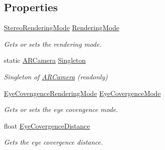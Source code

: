\subsection*{Properties}
\begin{DoxyCompactItemize}
\item 
\mbox{\hyperlink{class_ximmerse_1_1_slide_in_s_d_k_1_1_a_r_camera_af5ab911106768696ff764dd86e435d58}{Stereo\+Rendering\+Mode}} \mbox{\hyperlink{class_ximmerse_1_1_slide_in_s_d_k_1_1_a_r_camera_aafc2e51fcad4a3afd2d4be6a6beca488}{Rendering\+Mode}}
\begin{DoxyCompactList}\small\item\em Gets or sets the rendering mode. \end{DoxyCompactList}\item 
static \mbox{\hyperlink{class_ximmerse_1_1_slide_in_s_d_k_1_1_a_r_camera}{A\+R\+Camera}} \mbox{\hyperlink{class_ximmerse_1_1_slide_in_s_d_k_1_1_a_r_camera_aa35b0089674333aea7cabb9d9d8cb065}{Singleton}}
\begin{DoxyCompactList}\small\item\em Singleton of \mbox{\hyperlink{class_ximmerse_1_1_slide_in_s_d_k_1_1_a_r_camera}{A\+R\+Camera}} (readonly) \end{DoxyCompactList}\item 
\mbox{\hyperlink{class_ximmerse_1_1_slide_in_s_d_k_1_1_a_r_camera_a52b8f8314b24b886c20c6a8f4f7447bf}{Eye\+Covengence\+Rendering\+Mode}} \mbox{\hyperlink{class_ximmerse_1_1_slide_in_s_d_k_1_1_a_r_camera_aa8ea24d9b7f9f1edb8385e5be8b6706c}{Eye\+Covergence\+Mode}}
\begin{DoxyCompactList}\small\item\em Gets or sets the eye covengence mode. \end{DoxyCompactList}\item 
float \mbox{\hyperlink{class_ximmerse_1_1_slide_in_s_d_k_1_1_a_r_camera_acabcae53101b1000d42ca0598b392da9}{Eye\+Covergence\+Distance}}
\begin{DoxyCompactList}\small\item\em Gets the eye covergence distance. \end{DoxyCompactList}\item 

\end{DoxyCompactItemize}
